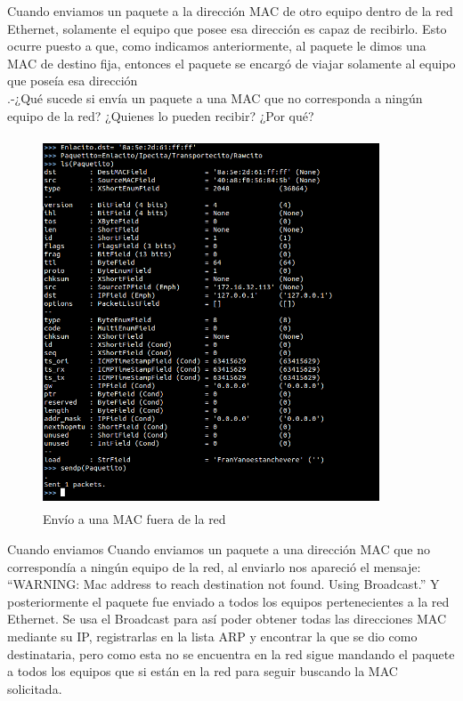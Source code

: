 \documentclass{udpreport}
\begin{document}
 	      Cuando enviamos un paquete a la dirección MAC de otro equipo dentro de la red Ethernet, solamente el equipo que posee
 	      esa dirección es capaz de recibirlo. Esto ocurre puesto a que, como indicamos anteriormente, al paquete le dimos una
 	      MAC de destino fija, entonces el paquete se encargó de viajar solamente al equipo que poseía esa dirección\\
        .-¿Qué sucede si envía un paquete a una MAC que no corresponda a ningún equipo
  	      de la red? ¿Quienes lo pueden recibir? ¿Por qué?\\
    		\begin{figure}[h]
  	          	\includegraphics[width=10cm,height=11cm]{PaqueteMacMala.png}
  	        	\caption{Envío a una MAC fuera de la red}
  	        \end{figure}
 	      Cuando enviamos 
 	      Cuando enviamos un paquete a una dirección MAC que no correspondía a ningún equipo de la red, al enviarlo nos apareció
 	      el mensaje: “WARNING: Mac address to reach destination not found. Using Broadcast.” Y posteriormente el paquete fue
 	      enviado a todos los equipos pertenecientes a la red Ethernet. Se usa el Broadcast para así poder obtener todas las
 	      direcciones MAC mediante su IP, registrarlas en la lista ARP y encontrar la que se dio como destinataria, pero como esta
 	      no se encuentra en la red sigue mandando el paquete a todos los equipos que si están en la red para seguir buscando la
 	      MAC solicitada.\\
\end{document}
